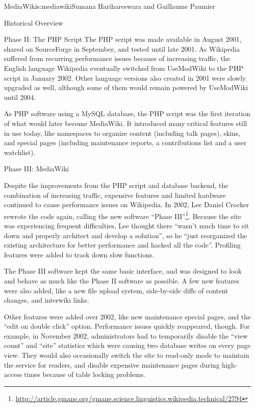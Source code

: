 \begin{aosachapter}{MediaWiki}{s:mediawiki}{Sumana Harihareswara and Guillaume Paumier}
\begin{aosasect1}{Historical Overview}
\begin{aosasect2}{Phase II: The PHP Script}
The PHP script was made available in August 2001, shared on
SourceForge in September, and tested until late 2001. As Wikipedia
suffered from recurring performance issues because of increasing
traffic, the English language Wikipedia eventually switched from
UseModWiki to the PHP script in January 2002. Other language versions
also created in 2001 were slowly upgraded as well, although some of
them would remain powered by UseModWiki until 2004.

As PHP software using a MySQL database, the PHP script was the first
iteration of what would later become MediaWiki. It introduced
many critical features still in use today, like namespaces to organize
content (including talk pages), skins, and special pages (including
maintenance reports, a contributions list and a user watchlist).

\end{aosasect2}

\begin{aosasect2}{Phase III: MediaWiki}

Despite the improvements from the PHP script and database backend,
the combination of increasing traffic, expensive features and limited
hardware continued to cause performance issues on Wikipedia. In 2002,
Lee Daniel Crocker rewrote the code again, calling the new software
``Phase III''\footnote{\url{http://article.gmane.org/gmane.science.linguistics.wikipedia.technical/2794}}. Because the site was experiencing frequent difficulties,
Lee thought there ``wasn't much time to sit down and properly architect
and develop a solution'', so he ``just reorganized the existing
architecture for better performance and hacked all the
code''. Profiling features were added to track down slow functions.

The Phase III software kept the same basic interface, and was designed
to look and behave as much like the Phase II software as possible. A
few new features were also added, like a new file upload system,
side-by-side diffs of content changes, and interwiki links.

Other features were added over 2002, like new maintenance special
pages, and the ``edit on double click'' option. Performance issues
quickly reappeared, though. For example, in November 2002,
administrators had to temporarily disable the ``view count'' and ``site''
statistics which were causing two database writes on every page
view. They would also occasionally switch the site to read-only mode
to maintain the service for readers, and disable expensive maintenance
pages during high-access times because of table locking problems.


\end{aosasect2}
\end{aosasect1}
\end{aosachapter}
